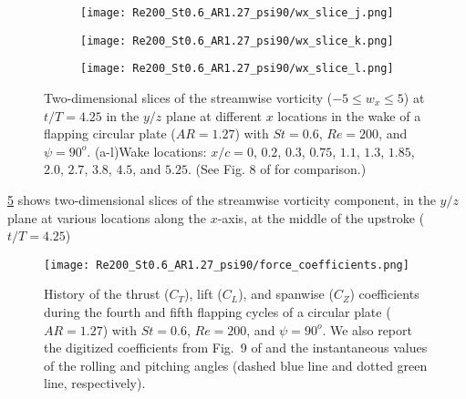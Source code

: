\begin{figure}[H]
\begin{subfigure}[t]{0.24\textwidth}
    \caption{}
    \label{fig:baseline_wx_slices:i}
  \end{subfigure}
  \begin{subfigure}[t]{0.24\textwidth}
    \centering
    \texttt{[image: Re200\_St0.6\_AR1.27\_psi90/wx\_slice\_j.png]}
    \caption{}
    \label{fig:baseline_wx_slices:j}
  \end{subfigure}
  \begin{subfigure}[t]{0.24\textwidth}
    \centering
    \texttt{[image: Re200\_St0.6\_AR1.27\_psi90/wx\_slice\_k.png]}
    \caption{}
    \label{fig:baseline_wx_slices:k}
  \end{subfigure}
  \begin{subfigure}[t]{0.24\textwidth}
    \centering
    \texttt{[image: Re200\_St0.6\_AR1.27\_psi90/wx\_slice\_l.png]}
    \caption{}
    \label{fig:baseline_wx_slices:l}
  \end{subfigure}
  \caption{Two-dimensional slices of the streamwise vorticity ($-5 \leq w_x \leq 5$) at $t / T = 4.25$ in the $y/z$ plane at different $x$ locations in the wake of a flapping circular plate ($AR = 1.27$) with $St = 0.6$, $Re = 200$, and $\psi = 90^o$. (a-l)Wake locations: $x / c = 0$, $0.2$, $0.3$, $0.75$, $1.1$, $1.3$, $1.85$, $2.0$, $2.7$, $3.8$, $4.5$, and $5.25$. (See Fig. 8 of \citet{li_dong_2016} for comparison.)}
  \label{fig:baseline_wx_slices}
\end{figure}

\cref{fig:baseline_wx_slices} shows two-dimensional slices of the streamwise vorticity component, in the $y/z$ plane at various locations along the $x$-axis, at the middle of the upstroke ($t/T = 4.25$)

\begin{figure}[!h]
  \centering
  \texttt{[image: Re200\_St0.6\_AR1.27\_psi90/force\_coefficients.png]}
  \caption{History of the thrust ($C_T$), lift ($C_L$), and spanwise ($C_Z$) coefficients during the fourth and fifth flapping cycles of a circular plate ($AR = 1.27$) with $St = 0.6$, $Re = 200$, and $\psi = 90^o$. We also report the digitized coefficients from Fig.\ 9 of \cite{li_dong_2016} and the instantaneous values of the rolling and pitching angles (dashed blue line and dotted green line, respectively).}
  \label{fig:baseline_force_coefficients}
\end{figure}

